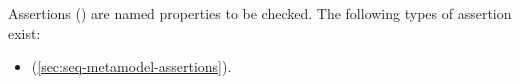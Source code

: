 
Assertions (\massertion) are named properties to be checked.  The following
types of assertion exist:

\begin{itemize}
\item \msequenceassertion{} (\cref{sec:seq-metamodel-assertions}).
\end{itemize}

